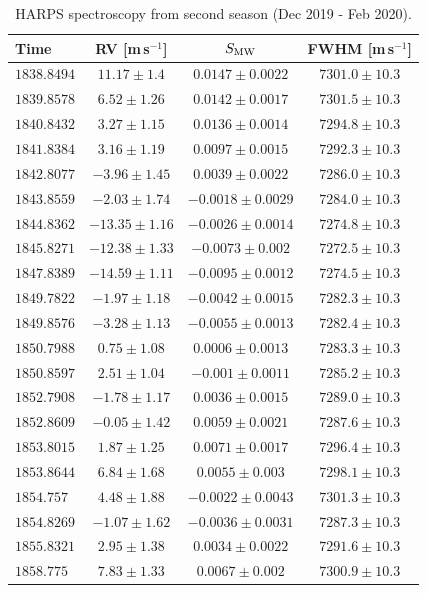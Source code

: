 \documentclass[fleqn,usenatbib]{mnras}
\newcommand{\harps}{{HARPS}}
\newcommand{\ms}{m\,s$^{-1}$}
\begin{document}
\begin{table}
\caption{\harps{} spectroscopy from second season (Dec 2019 - Feb 2020).}
\label{Spec2}
\small
\begin{tabular}{lccc}
\hline
\hline
Time & RV [\ms{}] & $S_{\rm MW}$ & FWHM [\ms{}] \\
\hline
\hline
$1838.8494$ & $11.17\pm1.4$ & $0.0147\pm0.0022$ & $7301.0\pm10.3$ \\
$1839.8578$ & $6.52\pm1.26$ & $0.0142\pm0.0017$ & $7301.5\pm10.3$ \\
$1840.8432$ & $3.27\pm1.15$ & $0.0136\pm0.0014$ & $7294.8\pm10.3$ \\
$1841.8384$ & $3.16\pm1.19$ & $0.0097\pm0.0015$ & $7292.3\pm10.3$ \\
$1842.8077$ & $-3.96\pm1.45$ & $0.0039\pm0.0022$ & $7286.0\pm10.3$ \\
$1843.8559$ & $-2.03\pm1.74$ & $-0.0018\pm0.0029$ & $7284.0\pm10.3$ \\
$1844.8362$ & $-13.35\pm1.16$ & $-0.0026\pm0.0014$ & $7274.8\pm10.3$ \\
$1845.8271$ & $-12.38\pm1.33$ & $-0.0073\pm0.002$ & $7272.5\pm10.3$ \\
$1847.8389$ & $-14.59\pm1.11$ & $-0.0095\pm0.0012$ & $7274.5\pm10.3$ \\
$1849.7822$ & $-1.97\pm1.18$ & $-0.0042\pm0.0015$ & $7282.3\pm10.3$ \\
$1849.8576$ & $-3.28\pm1.13$ & $-0.0055\pm0.0013$ & $7282.4\pm10.3$ \\
$1850.7988$ & $0.75\pm1.08$ & $0.0006\pm0.0013$ & $7283.3\pm10.3$ \\
$1850.8597$ & $2.51\pm1.04$ & $-0.001\pm0.0011$ & $7285.2\pm10.3$ \\
$1852.7908$ & $-1.78\pm1.17$ & $0.0036\pm0.0015$ & $7289.0\pm10.3$ \\
$1852.8609$ & $-0.05\pm1.42$ & $0.0059\pm0.0021$ & $7287.6\pm10.3$ \\
$1853.8015$ & $1.87\pm1.25$ & $0.0071\pm0.0017$ & $7296.4\pm10.3$ \\
$1853.8644$ & $6.84\pm1.68$ & $0.0055\pm0.003$ & $7298.1\pm10.3$ \\
$1854.757$ & $4.48\pm1.88$ & $-0.0022\pm0.0043$ & $7301.3\pm10.3$ \\
$1854.8269$ & $-1.07\pm1.62$ & $-0.0036\pm0.0031$ & $7287.3\pm10.3$ \\
$1855.8321$ & $2.95\pm1.38$ & $0.0034\pm0.0022$ & $7291.6\pm10.3$ \\
$1858.775$ & $7.83\pm1.33$ & $0.0067\pm0.002$ & $7300.9\pm10.3$ \\

\end{tabular}
\end{table}
\end{document}
